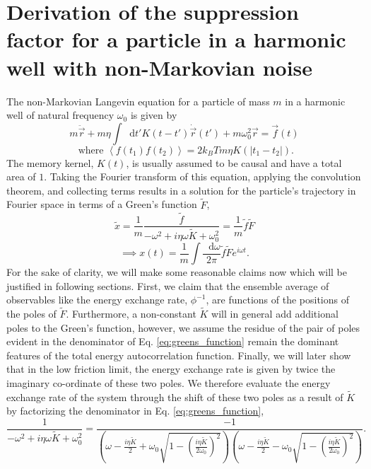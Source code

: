 \documentclass[7pt]{article}
\newcommand*{\diff}{\mathop{}\!\mathrm{d}}
\begin{document}
\section{Derivation of the suppression factor for a particle in a harmonic well with non-Markovian noise} \label{sec:suppresion_factor}

The non-Markovian Langevin equation for a particle of mass $m$ in a harmonic well of natural frequency $\omega_0$ is given by
\begin{equation}
	m\ddot{\vec{r}}+m\eta\int\diff{t'}K(t-t')\dot{\vec{r}}(t')+m\omega_0^2\vec{r}=\vec{f}(t)
\end{equation}
\begin{equation}
	\text{ where } \left<f(t_1)f(t_2)\right>=2k_BTm\eta K(\left|t_1-t_2\right|).
\end{equation}
The memory kernel, $K(t)$, is usually assumed to be causal and have a total area of $1$. Taking the Fourier transform of this equation, applying the convolution theorem, and collecting terms results in a solution for the particle's trajectory in Fourier space in terms of a Green's function $\tilde{F}$,
\begin{equation}
	\tilde{x} = \frac{1}{m} \frac{\tilde{f}}{-\omega^2 + i \eta \omega \tilde{K} + \omega_0^2} = \frac{1}{m} \tilde{f} \tilde{F} 
	\label{eq:greens_function}
\end{equation}
\begin{equation}
	\implies x(t) = \frac{1}{m}\int\frac{\diff{\omega}}{2\pi}\tilde{f} \tilde{F} e^{i\omega t}.
\end{equation}
For the sake of clarity, we will make some reasonable claims now which will be justified in following sections. First, we claim that the ensemble average of observables like the energy exchange rate, $\phi^{-1}$, are functions of the positions of the poles of $\tilde{F}$. Furthermore, a non-constant $\tilde{K}$ will in general add additional poles to the Green's function, however, we assume the residue of the pair of poles evident in the denominator of Eq. \ref{eq:greens_function} remain the dominant features of the total energy autocorrelation function. Finally, we will later show that in the low friction limit, the energy exchange rate is given by twice the imaginary co-ordinate of these two poles. We therefore evaluate the energy exchange rate of the system through the shift of these two poles as a result of $\tilde{K}$ by factorizing the denominator in Eq. \ref{eq:greens_function},
\begin{equation}
	\frac{1}{-\omega^2 + i \eta \omega \tilde{K} + \omega_0^2} = \frac{-1}{\left(\omega - \frac{i\eta\tilde{K}}{2} + \omega_0\sqrt{1-\left(\frac{i\eta\tilde{K}}{2\omega_0}\right)^2}\right)\left(\omega - \frac{i\eta\tilde{K}}{2} - \omega_0\sqrt{1-\left(\frac{i\eta\tilde{K}}{2\omega_0}\right)^2}\right)}.
\end{equation}
\end{document}
